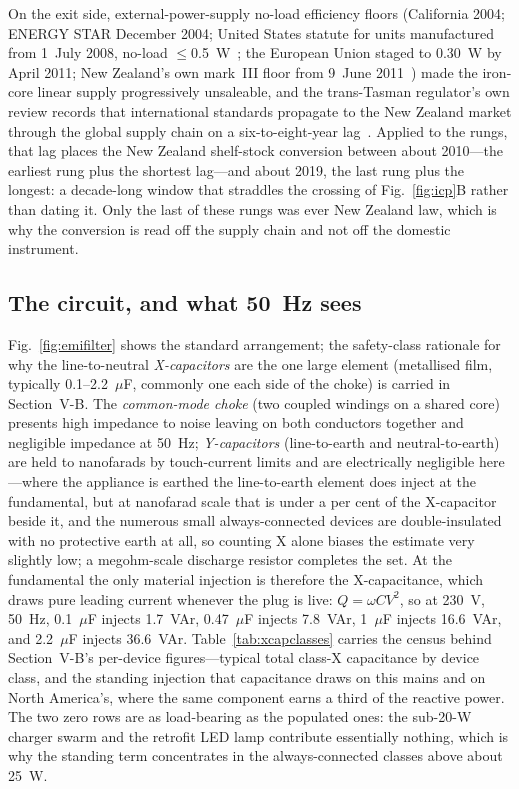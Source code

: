 \documentclass[journal]{IEEEtran}
\begin{document}
On the exit side, external-power-supply no-load
efficiency floors (California 2004; ENERGY STAR December 2004; United States
statute for units manufactured from 1~July 2008, no-load $\le$0.5~W~\cite{eisa2007};
the European Union staged to 0.30~W by April 2011; New Zealand's own mark~III
floor from 9~June 2011~\cite{nz_eps2011}) made the iron-core linear supply
progressively
unsaleable, and the trans-Tasman regulator's own review records that
international standards propagate to the New Zealand market through the global
supply chain on a six-to-eight-year lag~\cite{eeca_eps2025}. Applied to the
rungs, that lag places the New Zealand shelf-stock conversion between about
2010---the earliest rung plus the shortest lag---and about 2019, the last rung
plus the longest: a decade-long window that straddles the crossing of
Fig.~\ref{fig:icp}B rather than dating it. Only the last of these rungs was
ever New Zealand law, which is why the conversion is read off the supply chain
and not off the domestic instrument.

\subsection{The circuit, and what 50~Hz sees}
Fig.~\ref{fig:emifilter} shows the standard arrangement; the safety-class
rationale for why the line-to-neutral \emph{X-capacitors} are the one large
element (metallised film, typically 0.1--2.2~$\mu$F, commonly one each side of
the choke) is carried in Section~V-B. The \emph{common-mode choke}
(two coupled windings on a shared core) presents high impedance to noise
leaving on both conductors together and negligible impedance at 50~Hz;
\emph{Y-capacitors} (line-to-earth and neutral-to-earth) are held to
nanofarads by touch-current limits and are electrically negligible here---where
the appliance is earthed the line-to-earth element does inject at the
fundamental, but at nanofarad scale that is under a per cent of the
X-capacitor beside it, and the numerous small always-connected devices are
double-insulated with no protective earth at all, so counting X alone biases
the estimate very slightly low; a
megohm-scale discharge resistor completes the set. At the fundamental
the only material injection is therefore the X-capacitance, which draws
pure leading current whenever the plug is live: $Q=\omega C V^2$, so at 230~V,
50~Hz, 0.1~$\mu$F injects 1.7~VAr, 0.47~$\mu$F injects 7.8~VAr, 1~$\mu$F
injects 16.6~VAr, and 2.2~$\mu$F injects 36.6~VAr.
Table~\ref{tab:xcapclasses} carries the census behind Section~V-B's
per-device figures---typical total class-X capacitance by device class, and
the standing injection that capacitance draws on this mains and on North
America's, where the same component earns a third of the reactive power. The
two zero rows are as load-bearing as the populated ones: the sub-20-W charger
swarm and the retrofit LED lamp contribute essentially nothing, which is why
the standing term concentrates in the always-connected classes above about
25~W.
\end{document}
